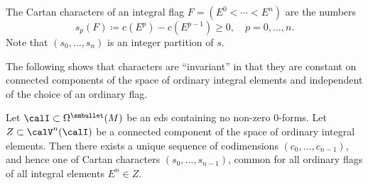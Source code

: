 \begin{defn}
    The Cartan characters of an integral flag $F=(E^0<\cdots<E^n)$ are the numbers 
    \[s_p(F)\coloneqq c(E^p)-c(E^{p-1})\geq 0,\quad p=0,\ldots,n.\]
    Note that $(s_0,\ldots,s_n)$ is an integer partition of $s$.
\end{defn}

The following shows that characters are ``invariant'' in that they are constant on connected components of the space of ordinary integral elements and independent of the choice of an ordinary flag.

\begin{prop}\label{prop iii.1.13, 2.4 Bryant}
    Let $\calI\subset \Omega^{\smbullet}(M)$ be an \gls{eds} containing no non-zero $0$-forms. Let $Z\subset\calV^n(\calI)$ be a connected component of the space of ordinary integral elements. Then there exists a unique sequence of codimensions $(c_0,\ldots,c_{n-1})$, and hence one of Cartan characters $(s_0,\ldots,s_{n-1})$, common for all ordinary flags of all integral elements $E^n\in Z$.
\end{prop}

